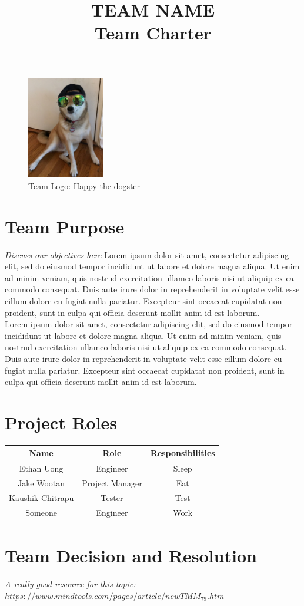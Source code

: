 \documentclass[10pt,a4paper]{article}
\begin{document}
 
\title{TEAM NAME \\
\large Team Charter}
\date{}
\maketitle

\begin{figure}
    \includegraphics[width=0.30\textwidth]{logo.png}
    \caption{Team Logo: Happy the dogster}
\end{figure}

\section*{Team Purpose}
\textit{Discuss our objectives here}
Lorem ipsum dolor sit amet, consectetur adipiscing elit, sed do eiusmod tempor incididunt ut labore et dolore magna aliqua. Ut enim ad minim veniam, quis nostrud exercitation ullamco laboris nisi ut aliquip ex ea commodo consequat. Duis aute irure dolor in reprehenderit in voluptate velit esse cillum dolore eu fugiat nulla pariatur. Excepteur sint occaecat cupidatat non proident, sunt in culpa qui officia deserunt mollit anim id est laborum.\\

Lorem ipsum dolor sit amet, consectetur adipiscing elit, sed do eiusmod tempor incididunt ut labore et dolore magna aliqua. Ut enim ad minim veniam, quis nostrud exercitation ullamco laboris nisi ut aliquip ex ea commodo consequat. Duis aute irure dolor in reprehenderit in voluptate velit esse cillum dolore eu fugiat nulla pariatur. Excepteur sint occaecat cupidatat non proident, sunt in culpa qui officia deserunt mollit anim id est laborum.

\section*{Project Roles}
\begin{table}[h]
  \begin{center}
    \begin{tabular}{c|c|c}
      Name & Role & Responsibilities\\\hline
      Ethan Uong & Engineer & Sleep\\\hline
      Jake Wootan & Project Manager & Eat\\\hline
      Kaushik Chitrapu & Tester & Test\\\hline
      Someone & Engineer & Work\\\hline
    \end{tabular}
  \end{center}
\end{table}

\section*{Team Decision and Resolution}
\textit{A really good resource for this topic: $https://www.mindtools.com/pages/article/newTMM_79.htm$}
\end{document}
